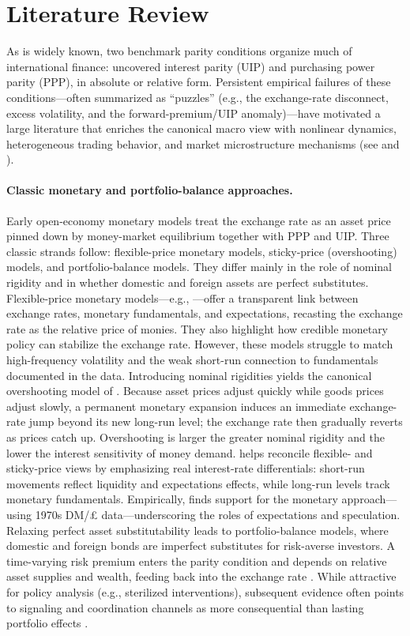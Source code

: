 \documentclass[a4paper,10pt,final]{article}    %
\begin{document}
\section{Literature Review}
\label{chap:literature}

As is widely known, two benchmark parity conditions organize much of international finance: uncovered interest parity (UIP) and purchasing power parity (PPP), in absolute or relative form. Persistent empirical failures of these conditions---often summarized as ``puzzles'' (e.g., the exchange-rate disconnect, excess volatility, and the forward-premium/UIP anomaly)---have motivated a large literature that enriches the canonical macro view with nonlinear dynamics, heterogeneous trading behavior, and market microstructure mechanisms (see \citealp{SarnoTaylor2001} and \citealp{Evans2011}).

\paragraph{Classic monetary and portfolio-balance approaches.}
Early open-economy monetary models treat the exchange rate as an asset price pinned down by money-market equilibrium together with PPP and UIP. Three classic strands follow: flexible-price monetary models, sticky-price (overshooting) models, and portfolio-balance models. They differ mainly in the role of nominal rigidity and in whether domestic and foreign assets are perfect substitutes.
Flexible-price monetary models---e.g., \citep{Frenkel1976,Bilson1978}---offer a transparent link between exchange rates, monetary fundamentals, and expectations, recasting the exchange rate as the relative price of monies. They also highlight how credible monetary policy can stabilize the exchange rate. However, these models struggle to match high-frequency volatility and the weak short-run connection to fundamentals documented in the data.
Introducing nominal rigidities yields the canonical overshooting model of \citet{Dornbusch1976}. Because asset prices adjust quickly while goods prices adjust slowly, a permanent monetary expansion induces an immediate exchange-rate jump beyond its new long-run level; the exchange rate then gradually reverts as prices catch up. Overshooting is larger the greater nominal rigidity and the lower the interest sensitivity of money demand. \citet{Frankel1979} helps reconcile flexible- and sticky-price views by emphasizing real interest-rate differentials: short-run movements reflect liquidity and expectations effects, while long-run levels track monetary fundamentals. Empirically, \citet{Bilson1978} finds support for the monetary approach—using 1970s DM/\pounds{} data—underscoring the roles of expectations and speculation.
Relaxing perfect asset substitutability leads to portfolio-balance models, where domestic and foreign bonds are imperfect substitutes for risk-averse investors. A time-varying risk premium enters the parity condition and depends on relative asset supplies and wealth, feeding back into the exchange rate \citep{BransonHenderson1985,FrenkelMussa1985}. While attractive for policy analysis (e.g., sterilized interventions), subsequent evidence often points to signaling and coordination channels as more consequential than lasting portfolio effects \citep{SarnoTaylor2001}.
\end{document}

